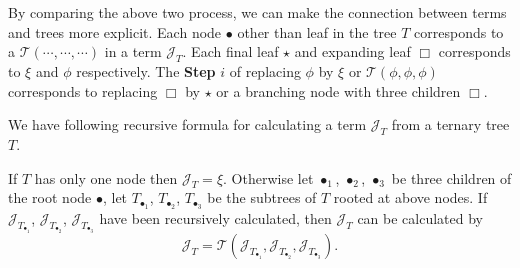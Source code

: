 \begin{itemize}
    

    
\end{itemize}


By comparing the above two process, we can make the connection between terms and trees more explicit. Each node $\bullet$ other than leaf in the tree $T$ corresponds to a $\mathcal{T}(\cdots,\cdots,\cdots)$ in a term $\mathcal{J}_{T}$. Each final leaf $\star$ and expanding leaf $\Box$ corresponds to $\xi$ and $\phi$ respectively. The \textbf{Step} $i$ of replacing $\phi$ by $\xi$ or $\mathcal{T}(\phi,\phi,\phi)$ corresponds to replacing $\Box$ by $\star$ or a branching node with three children $\Box$.

We have following recursive formula for calculating a term $\mathcal{J}_T$ from a ternary tree $T$. 

If $T$ has only one node then $\mathcal{J}_T=\xi$. Otherwise let $\bullet_1$, $\bullet_2$, $\bullet_3$ be three children of the root node $\bullet$, let $T_{\bullet_1}$, $T_{\bullet_2}$, $T_{\bullet_3}$ be the subtrees of $T$ rooted at above nodes. If $\mathcal{J}_{T_{\bullet_1}}$, $\mathcal{J}_{T_{\bullet_2}}$, $\mathcal{J}_{T_{\bullet_3}}$ have been recursively calculated, then $\mathcal{J}_T$ can be calculated by
\begin{equation}\label{eq.treeterm'}
    \mathcal{J}_T=\mathcal{T}(\mathcal{J}_{T_{\bullet_1}}, \mathcal{J}_{T_{\bullet_2}}, \mathcal{J}_{T_{\bullet_3}}).
\end{equation}

